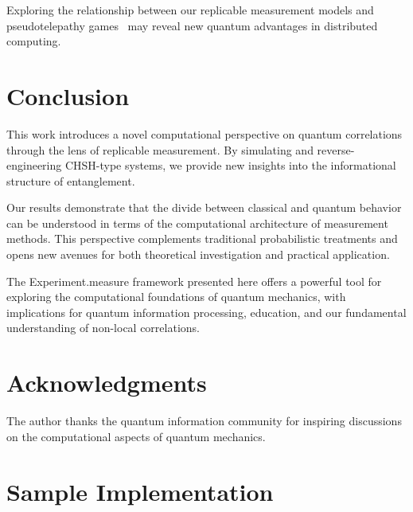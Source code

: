 \documentclass[11pt,a4paper]{article}
\begin{document}
Exploring the relationship between our replicable measurement models and pseudotelepathy games~\cite{brassard2005} may reveal new quantum advantages in distributed computing.

\section{Conclusion}

This work introduces a novel computational perspective on quantum correlations through the lens of replicable measurement. By simulating and reverse-engineering CHSH-type systems, we provide new insights into the informational structure of entanglement.

Our results demonstrate that the divide between classical and quantum behavior can be understood in terms of the computational architecture of measurement methods. This perspective complements traditional probabilistic treatments and opens new avenues for both theoretical investigation and practical application.

The Experiment.measure framework presented here offers a powerful tool for exploring the computational foundations of quantum mechanics, with implications for quantum information processing, education, and our fundamental understanding of non-local correlations.

\section*{Acknowledgments}

The author thanks the quantum information community for inspiring discussions on the computational aspects of quantum mechanics.

\appendix

\section{Sample Implementation}
\end{document}
